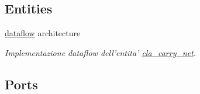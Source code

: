 \subsection*{Entities}
\begin{DoxyCompactItemize}
\item 
\hyperlink{classcla__carry__net_1_1dataflow}{dataflow} architecture
\begin{DoxyCompactList}\small\item\em Implementazione dataflow dell'entita' \hyperlink{classcla__carry__net}{cla\+\_\+carry\+\_\+net}. \end{DoxyCompactList}\end{DoxyCompactItemize}
\subsection*{Ports}
